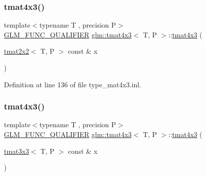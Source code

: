 \mbox{\label{structglm_1_1tmat4x3_a0a7982fe88164b1cc7ae9ddac2b62ac0}} 
\subsubsection{\texorpdfstring{tmat4x3()}{tmat4x3()}\hspace{0.1cm}{\footnotesize\ttfamily [11/22]}}
{\footnotesize\ttfamily template$<$typename T , precision P$>$ \\
\mbox{\hyperlink{setup_8hpp_a33fdea6f91c5f834105f7415e2a64407}{G\+L\+M\+\_\+\+F\+U\+N\+C\+\_\+\+Q\+U\+A\+L\+I\+F\+I\+ER}} \mbox{\hyperlink{structglm_1_1tmat4x3}{glm\+::tmat4x3}}$<$ T, P $>$\+::\mbox{\hyperlink{structglm_1_1tmat4x3}{tmat4x3}} (\begin{DoxyParamCaption}\item[{\mbox{\hyperlink{structglm_1_1tmat2x2}{tmat2x2}}$<$ T, P $>$ const \&}]{x }\end{DoxyParamCaption})}



Definition at line 136 of file type\+\_\+mat4x3.\+inl.

\mbox{\label{structglm_1_1tmat4x3_a28c08dee803c5fb0fe8c2c824f58681d}} 
\subsubsection{\texorpdfstring{tmat4x3()}{tmat4x3()}\hspace{0.1cm}{\footnotesize\ttfamily [12/22]}}
{\footnotesize\ttfamily template$<$typename T , precision P$>$ \\
\mbox{\hyperlink{setup_8hpp_a33fdea6f91c5f834105f7415e2a64407}{G\+L\+M\+\_\+\+F\+U\+N\+C\+\_\+\+Q\+U\+A\+L\+I\+F\+I\+ER}} \mbox{\hyperlink{structglm_1_1tmat4x3}{glm\+::tmat4x3}}$<$ T, P $>$\+::\mbox{\hyperlink{structglm_1_1tmat4x3}{tmat4x3}} (\begin{DoxyParamCaption}\item[{\mbox{\hyperlink{structglm_1_1tmat3x3}{tmat3x3}}$<$ T, P $>$ const \&}]{x }\end{DoxyParamCaption})}



